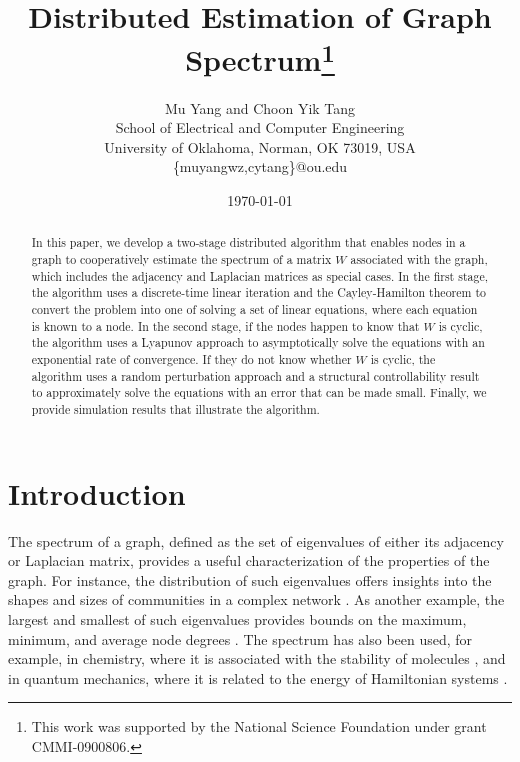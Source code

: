 \documentclass[11pt]{article}
\theoremstyle{plain}
\theoremstyle{definition}
\theoremstyle{remark}
\begin{document}
\title{\LARGE\bf Distributed Estimation of Graph Spectrum\footnote{This work was supported by the National Science Foundation under grant CMMI-0900806.}}
\author{Mu Yang and Choon Yik Tang\\ School of Electrical and Computer Engineering\\ University of Oklahoma, Norman, OK 73019, USA\\ {\sf\{muyangwz,cytang\}@ou.edu}}
\date{\today}
\maketitle

\begin{abstract}
In this paper, we develop a two-stage distributed algorithm that enables nodes in a graph to cooperatively estimate the spectrum of a matrix $W$ associated with the graph, which includes the adjacency and Laplacian matrices as special cases. In the first stage, the algorithm uses a discrete-time linear iteration and the Cayley-Hamilton theorem to convert the problem into one of solving a set of linear equations, where each equation is known to a node. In the second stage, if the nodes happen to know that $W$ is cyclic, the algorithm uses a Lyapunov approach to asymptotically solve the equations with an exponential rate of convergence. If they do not know whether $W$ is cyclic, the algorithm uses a random perturbation approach and a structural controllability result to approximately solve the equations with an error that can be made small. Finally, we provide simulation results that illustrate the algorithm.
\end{abstract}

\section{Introduction}\label{sec:intr}

The spectrum of a graph, defined as the set of eigenvalues of either its adjacency or Laplacian matrix, provides a useful characterization of the properties of the graph. For instance, the distribution of such eigenvalues offers insights into the shapes and sizes of communities in a complex network \cite{Newman10}. As another example, the largest and smallest of such eigenvalues provides bounds on the maximum, minimum, and average node degrees \cite{Chung97}. The spectrum has also been used, for example, in chemistry, where it is associated with the stability of molecules \cite{Chung97}, and in quantum mechanics, where it is related to the energy of Hamiltonian systems \cite{Chung97}.
\end{document}
